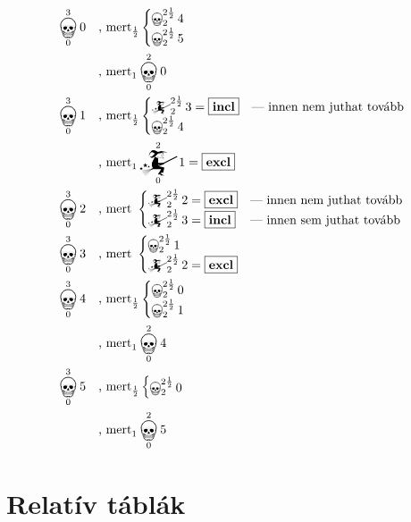 \documentclass{article}
\newcommand{\just}[1]{\boxed{#1}}%
\newcommand{\incl}{\mathbf{incl}}
\newcommand{\excl}{\mathbf{excl}}
\newcommand{\mainfun}[3]{\mathwitch_{#1}^{#2}#3}
\newcommand{\nomainfun}[3]{\bigskull_{#1}^{#2}#3}
\begin{document}
	\begin{align*}
		&\nomainfun030   &&\text{, mert}_\frac12\begin{cases}\nomainfun2{2\frac12}4\\\nomainfun2{2\frac12}5\end{cases}\\
		&                &&\text{, mert}_1\nomainfun020\\
		&\nomainfun031   &&\text{, mert}_\frac12\begin{cases}\mainfun2{2\frac12}3 = \just\incl&\text{--- innen nem juthat tovább}\\\nomainfun2{2\frac12}4\end{cases}\\
		&                &&\text{, mert}_1\mainfun021 = \just\excl\\
		&\nomainfun032   &&\text{, mert }\begin{cases}\mainfun2{2\frac12}2 = \just\excl&\text{--- innen nem juthat tovább}\\\mainfun2{2\frac12}3 = \just\incl&\text{--- innen sem juthat tovább}\end{cases}\\
		&\nomainfun033   &&\text{, mert }\begin{cases}\nomainfun2{2\frac12}1\\\mainfun2{2\frac12}2 = \just\excl&\end{cases}\\
		&\nomainfun034   &&\text{, mert}_\frac12\begin{cases}\nomainfun2{2\frac12}0\\\nomainfun2{2\frac12}1\end{cases}\\
		&                &&\text{, mert}_1\nomainfun024\\
		&\nomainfun035   &&\text{, mert}_\frac12\begin{cases}\nomainfun2{2\frac12}0\end{cases}\\
		&                &&\text{, mert}_1\nomainfun025
	\end{align*}


	\section{Relatív táblák}
\end{document}
